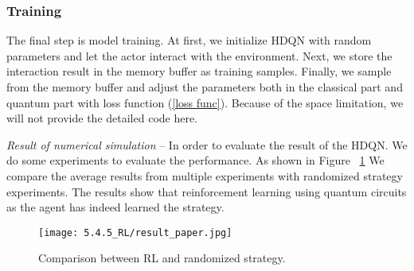 \subsubsection{Training}
The final step is model training. At first, we initialize HDQN with random parameters and let the actor interact with the environment. Next, we store the interaction result in the memory buffer as training samples. Finally, we sample from the memory buffer and adjust the parameters both in the classical part and quantum part with loss function (\ref{loss func}). Because of the space limitation, we will not provide the detailed code here.

\textit{Result of numerical simulation} -- In order to evaluate the result of the HDQN. We do some experiments to evaluate the performance. As shown in Figure ~\ref{stochastic} We compare the average results from multiple experiments with randomized strategy experiments. The results show that reinforcement learning using quantum circuits as the agent has indeed learned the strategy.
\begin{figure}[ht]
  \centering
  \texttt{[image: 5.4.5\_RL/result\_paper.jpg]}
  \caption{\label{stochastic} Comparison between RL and randomized strategy.}
\end{figure}
